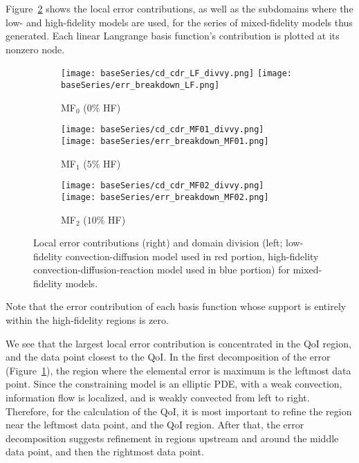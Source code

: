 Figure~\ref{fig:baseRef} shows the local error contributions, as well as the subdomains where the low- and high-fidelity models are used, for the series of mixed-fidelity models thus generated. Each linear Langrange basis function's contribution is plotted at its nonzero node.
%
\begin{figure}[h!]
\captionsetup[subfigure]{justification=centering,aboveskip=-10pt}
\centering
  \begin{subfigure}[b]{\textwidth}
  \centering    
    \texttt{[image: baseSeries/cd\_cdr\_LF\_divvy.png]}
    \texttt{[image: baseSeries/err\_breakdown\_LF.png]}
    \vspace{-0.5\baselineskip}
    \caption{MF$_0$ ($0\%$ HF)}
    \label{fig:baseRef0}
    \vspace{0.8\baselineskip}
  \end{subfigure}
	\begin{subfigure}[b]{\textwidth}
  \centering
    \texttt{[image: baseSeries/cd\_cdr\_MF01\_divvy.png]}
    \texttt{[image: baseSeries/err\_breakdown\_MF01.png]}
    \vspace{-0.5\baselineskip}
    \caption{MF$_1$ ($5\%$ HF)}
    \vspace{0.8\baselineskip}
  \end{subfigure}
  \begin{subfigure}[b]{\textwidth}
  \centering
    \texttt{[image: baseSeries/cd\_cdr\_MF02\_divvy.png]}
    \texttt{[image: baseSeries/err\_breakdown\_MF02.png]}
    \vspace{-0.5\baselineskip}
    \caption{MF$_2$ ($10\%$ HF)}
    \vspace{0.8\baselineskip}
  \end{subfigure}
\caption{Local error contributions (right) and domain division (left; low-fidelity convection-diffusion model used in red portion, high-fidelity convection-diffusion-reaction model used in blue portion) for mixed-fidelity models.}
\label{fig:baseRef}
\end{figure}
%
Note that the error contribution of each basis function whose support is entirely within the high-fidelity regions is zero.

We see that the largest local error contribution is concentrated in the QoI region, and the data point closest to the QoI. In the first decomposition of the error (Figure~\ref{fig:baseRef0}), the region where the elemental error is maximum is the leftmost data point. Since the constraining model is an elliptic PDE, with a weak convection, information flow is localized, and is weakly convected from left to right. Therefore, for the calculation of the QoI, it is most important to refine the region near the leftmost data point, and the QoI region. After that, the error decomposition suggests refinement in regions upstream and around the middle data point, and then the rightmost data point.

